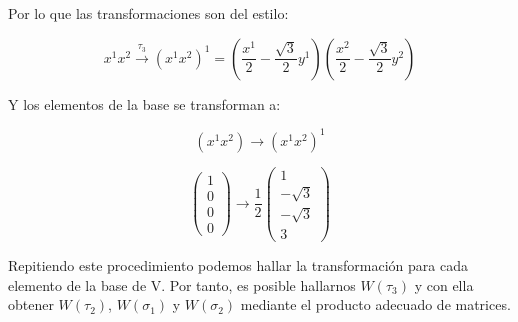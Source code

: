 \begin{enumerate}
\begin{enumerate}
Por lo que las transformaciones son del estilo:

$$x^1x^2 \overset{\tau _3}{\longrightarrow} (x^1 x^2)^1=\left ( \frac{x^1}{2}-\frac{\sqrt{3}}{2}y^1 \right) \left ( \frac{x^2}{2}-\frac{\sqrt{3}}{2}y^2 \right)$$

Y los elementos de la base se transforman a:

$$(x^1x^2) \longrightarrow (x^1x^2)^1$$

$$\left( \begin{array}{c}
 1  \\
 0 \\
 0 \\
 0
\end{array} \right )\longrightarrow \frac{1}{2} \left( \begin{array}{c}
 1  \\
 -\sqrt{3} \\
 -\sqrt{3}\\
 3
\end{array} \right )$$

Repitiendo este procedimiento podemos hallar la transformación para cada elemento de la base de V. Por tanto, es posible hallarnos $W(\tau _3)$ y con ella obtener $W(\tau _2)$, $W(\sigma _1)$ y $W(\sigma _2)$ mediante el producto adecuado de matrices.
\end{enumerate}
\end{enumerate}

\newpage
